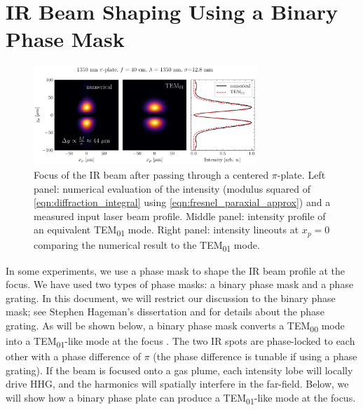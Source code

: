 \section{IR Beam Shaping Using a Binary Phase Mask}
\label{sec:pi-plate-math}

\begin{figure}
	\centering
	\includegraphics[width=0.75\textwidth]{figures/chap1/pi_plate_focus_LP_TEM_1350nm.pdf}
	\caption{Focus of the IR beam after passing through a centered $\pi$-plate. Left panel: numerical evaluation of the intensity (modulus squared of \cref{eqn:diffraction_integral} using \cref{eqn:fresnel_paraxial_approx}) and a measured input laser beam profile. Middle panel: intensity profile of an equivalent TEM\textsubscript{01} mode. Right panel: intensity lineouts at $x_p = 0$ comparing the numerical result to the TEM\textsubscript{01} mode.}
	\label{fig:pi_plate_focus_sim}
\end{figure}


In some experiments, we use a phase mask to shape the IR beam profile at the focus. We have used two types of phase masks: a binary phase mask and a phase grating. In this document, we will restrict our discussion to the binary phase mask; see Stephen Hageman's dissertation \cite{hagemanComplexAttosecondTransientAbsorption2020} and \cite{camperHighRelativephasePrecision2019} for details about the phase grating. As will be shown below, a binary phase mask converts a TEM\textsubscript{00} mode into a TEM\textsubscript{01}-like mode at the focus \cite{hagemanComplexAttosecondTransientAbsorption2020,camperHighRelativephasePrecision2019,camperTransverseElectromagneticMode2015,camperHighharmonicPhaseSpectroscopy2014,camperCombinedHighharmonicInterferometries2015}. The two IR spots are phase-locked to each other with a phase difference of $\pi$ (the phase difference is tunable if using a phase grating). If the beam is focused onto a gas plume, each intensity lobe will locally drive HHG, and the harmonics will spatially interfere in the far-field. Below, we will show how a binary phase plate can produce a TEM\textsubscript{01}-like mode at the focus.

